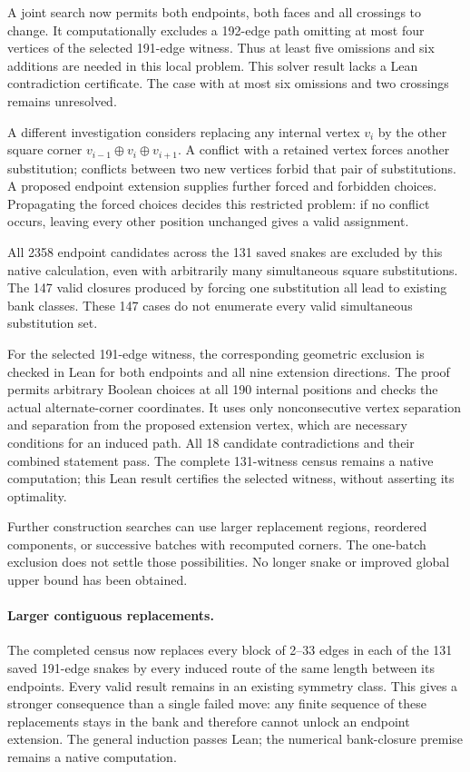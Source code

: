 \documentclass[11pt,a4paper]{article}
\begin{document}
A joint search now permits both endpoints, both faces and all crossings
to change. It computationally excludes a 192-edge path omitting at
most four vertices of the selected 191-edge witness. Thus at least
five omissions and six additions are needed in this local problem.
This solver result lacks a Lean contradiction certificate. The case
with at most six omissions and two crossings remains unresolved.

A different investigation considers replacing any internal vertex
$v_i$ by the other square corner
$v_{i-1}\oplus v_i\oplus v_{i+1}$. A conflict with a retained vertex
forces another substitution; conflicts between two new vertices
forbid that pair of substitutions. A proposed endpoint extension
supplies further forced and forbidden choices. Propagating the forced
choices decides this restricted problem: if no conflict occurs,
leaving every other position unchanged gives a valid assignment.

All 2358 endpoint candidates across the 131 saved snakes are excluded
by this native calculation, even with arbitrarily many simultaneous
square substitutions. The 147 valid closures produced by forcing one
substitution all lead to existing bank classes. These 147 cases do
not enumerate every valid simultaneous substitution set.

For the selected 191-edge witness, the corresponding geometric
exclusion is checked in Lean for both endpoints and all nine extension
directions. The proof permits arbitrary Boolean choices at all 190
internal positions and checks the actual alternate-corner coordinates.
It uses only nonconsecutive vertex separation and separation from the
proposed extension vertex, which are necessary conditions for an induced
path. All 18 candidate contradictions and their combined statement pass.
The complete 131-witness census remains a native computation; this Lean
result certifies the selected witness, without asserting its optimality.


Further construction searches can use larger replacement regions,
reordered components, or successive batches with recomputed corners.
The one-batch exclusion does not settle those possibilities.
No longer snake or improved global upper bound has been obtained.



\paragraph{Larger contiguous replacements.}
The completed census now replaces every block of 2--33 edges in each
of the 131 saved 191-edge snakes by every induced route of the same
length between its endpoints. Every valid result remains in an
existing symmetry class. This gives a stronger consequence than a
single failed move: any finite sequence of these replacements stays
in the bank and therefore cannot unlock an endpoint extension.
The general induction passes Lean; the numerical bank-closure premise
remains a native computation.
\end{document}
